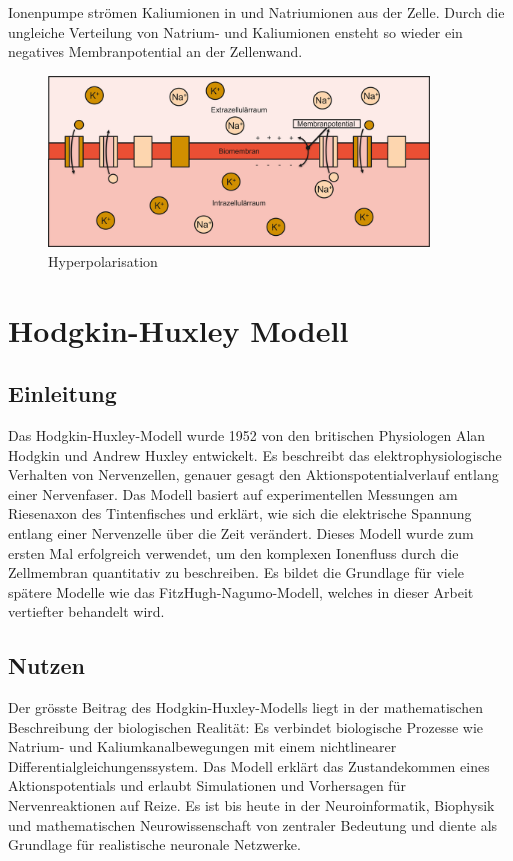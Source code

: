 \begin{refsection}
Ionenpumpe strömen Kaliumionen in und Natriumionen aus der Zelle.
Durch die ungleiche Verteilung von Natrium- und Kaliumionen ensteht so wieder ein negatives Membranpotential an der Zellenwand.
\begin{figure}[H]
    \centering
    \includegraphics[width=0.9\textwidth]{papers/nerven/Bilder/Vorgang5.png}
    \caption{Hyperpolarisation}
    \label{fig:Hyperpolarisation}
\end{figure}

\section{Hodgkin-Huxley Modell}
\subsection{Einleitung}
Das Hodgkin-Huxley-Modell wurde 1952 von den britischen Physiologen Alan Hodgkin und Andrew Huxley entwickelt. Es beschreibt das elektrophysiologische Verhalten von Nervenzellen, genauer gesagt den Aktionspotentialverlauf entlang einer Nervenfaser. Das Modell basiert auf experimentellen Messungen am Riesenaxon des Tintenfisches und erklärt, wie sich die elektrische Spannung entlang einer Nervenzelle über die Zeit verändert. Dieses Modell wurde zum ersten Mal erfolgreich verwendet, um den komplexen Ionenfluss durch die Zellmembran quantitativ zu beschreiben. Es bildet die Grundlage für viele spätere Modelle wie das FitzHugh-Nagumo-Modell, welches in dieser Arbeit vertiefter behandelt wird.
\subsection{Nutzen}
Der grösste Beitrag des Hodgkin-Huxley-Modells liegt in der mathematischen Beschreibung der biologischen Realität: Es verbindet biologische Prozesse wie Natrium- und Kaliumkanalbewegungen mit einem nichtlinearer Differentialgleichungenssystem. Das Modell erklärt das Zustandekommen eines Aktionspotentials und erlaubt Simulationen und Vorhersagen für Nervenreaktionen auf Reize. Es ist bis heute in der Neuroinformatik, Biophysik und mathematischen Neurowissenschaft von zentraler Bedeutung und diente als Grundlage für realistische neuronale Netzwerke.

\end{refsection}
